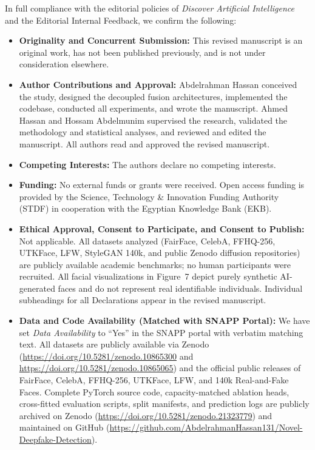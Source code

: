 \documentclass[10pt,a4paper]{article}
\begin{document}
In full compliance with the editorial policies of \textit{Discover Artificial Intelligence} and the Editorial Internal Feedback, we confirm the following:

\begin{itemize}[leftmargin=1.4em,itemsep=2.5pt,topsep=3pt]
    \item \textbf{Originality and Concurrent Submission:} This revised manuscript is an original work, has not been published previously, and is not under consideration elsewhere.
    \item \textbf{Author Contributions and Approval:} Abdelrahman Hassan conceived the study, designed the decoupled fusion architectures, implemented the codebase, conducted all experiments, and wrote the manuscript. Ahmed Hassan and Hossam Abdelmunim supervised the research, validated the methodology and statistical analyses, and reviewed and edited the manuscript. All authors read and approved the revised manuscript.
    \item \textbf{Competing Interests:} The authors declare no competing interests.
    \item \textbf{Funding:} No external funds or grants were received. Open access funding is provided by the Science, Technology \& Innovation Funding Authority (STDF) in cooperation with the Egyptian Knowledge Bank (EKB).
    \item \textbf{Ethical Approval, Consent to Participate, and Consent to Publish:} Not applicable. All datasets analyzed (FairFace, CelebA, FFHQ-256, UTKFace, LFW, StyleGAN 140k, and public Zenodo diffusion repositories) are publicly available academic benchmarks; no human participants were recruited. All facial visualizations in Figure~7 depict purely synthetic AI-generated faces and do not represent real identifiable individuals. Individual subheadings for all Declarations appear in the revised manuscript.
    \item \textbf{Data and Code Availability (Matched with SNAPP Portal):} We have set \textit{Data Availability} to ``Yes'' in the SNAPP portal with verbatim matching text. All datasets are publicly available via Zenodo (\url{https://doi.org/10.5281/zenodo.10865300} and \url{https://doi.org/10.5281/zenodo.10865065}) and the official public releases of FairFace, CelebA, FFHQ-256, UTKFace, LFW, and 140k Real-and-Fake Faces. Complete PyTorch source code, capacity-matched ablation heads, cross-fitted evaluation scripts, split manifests, and prediction logs are publicly archived on Zenodo (\url{https://doi.org/10.5281/zenodo.21323779}) and maintained on GitHub (\url{https://github.com/AbdelrahmanHassan131/Novel-Deepfake-Detection}).
\end{itemize}
\end{document}
